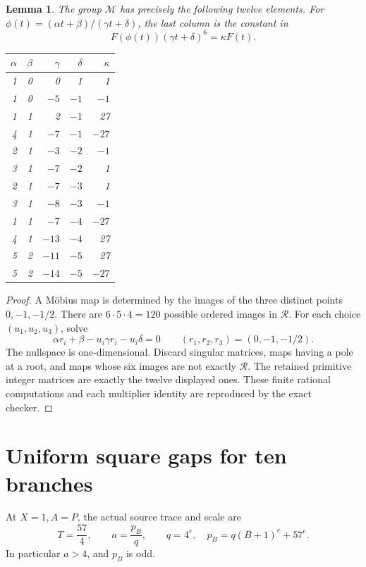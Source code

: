 \documentclass[11pt,a4paper]{article}
\newtheorem{lemma}[theorem]{Lemma}
\begin{document}
\begin{lemma}\label{lem:menu}
The group $\mathcal M$ has precisely the following twelve elements.
For $\phi(t)=(\alpha t+\beta)/(\gamma t+\delta)$, the last column is
the constant in
\[
                F(\phi(t))(\gamma t+\delta)^6=\kappa F(t).
\]
\begin{center}
\begin{tabular}{rrrrr}\toprule
$\alpha$&$\beta$&$\gamma$&$\delta$&$\kappa$\\\midrule
1&0&0&1&1\\
1&0&$-5$&$-1$&$-1$\\
1&1&2&$-1$&27\\
4&1&$-7$&$-1$&$-27$\\
2&1&$-3$&$-2$&$-1$\\
3&1&$-7$&$-2$&1\\
2&1&$-7$&$-3$&1\\
3&1&$-8$&$-3$&$-1$\\
1&1&$-7$&$-4$&$-27$\\
4&1&$-13$&$-4$&27\\
5&2&$-11$&$-5$&27\\
5&2&$-14$&$-5$&$-27$\\\bottomrule
\end{tabular}
\end{center}
\end{lemma}
\begin{proof}
A M\"obius map is determined by the images of the three distinct
points $0,-1,-1/2$. There are $6\cdot5\cdot4=120$ possible ordered
images in $\mathcal R$. For each choice $(u_1,u_2,u_3)$, solve
\[
 \alpha r_i+\beta-u_i\gamma r_i-u_i\delta=0
 \qquad(r_1,r_2,r_3)=(0,-1,-1/2).
\]
The nullspace is one-dimensional. Discard singular matrices, maps
having a pole at a root, and maps whose six images are not exactly
$\mathcal R$. The retained primitive integer matrices are exactly
the twelve displayed ones. These finite rational computations and
each multiplier identity are reproduced by the exact checker.
\end{proof}

\section{Uniform square gaps for ten branches}

At $X=1,A=P$, the actual source trace and scale are
\begin{equation}\label{eq:actualscale}
 T=\frac{57}{4},\qquad
 a=\frac{p_B}{q},\qquad
 q=4^e,\quad p_B=q(B+1)^e+57^e.
\end{equation}
In particular $a>4$, and $p_B$ is odd.
\end{document}
